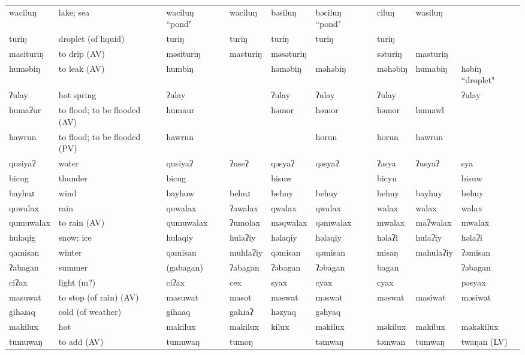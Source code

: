 \begin{landscape}
\begin{longtable}{*{9}{p{}}}
\text{*}waciluŋ & lake; sea & waciluŋ ``pond" & waciluŋ & bəsiluŋ & bəciluŋ ``pond" & ciluŋ & wasiluŋ & \\
\text{*}turiŋ & droplet (of liquid) & turiŋ & turiŋ & turiŋ & turiŋ & turiŋ &  & \\
\text{*}masituriŋ & to drip (AV) & məsituriŋ & masturiŋ & məsəturiŋ &  & səturiŋ & masturiŋ & \\
\text{*}huməbiŋ & to leak (AV) & humbiŋ &  & həməbiŋ & məhəbiŋ & məhəbiŋ & humabiŋ & həbiŋ ``droplet"\\
\text{*}ʔulay & hot spring & ʔulay &  & ʔulay & ʔulay & ʔulay &  & ʔulay\\
\text{*}humaʔur & to flood; to be flooded (AV) & humaur &  & həmor & həmor & həmor & humawl & \\
\text{*}hawrun & to flood; to be flooded (PV) & hawrun &  &  & horun & horun & hawrun & \\
\text{*}qusiyaʔ & water & qusiyaʔ & ʔuseʔ & qəsyaʔ & qəsyaʔ & ʔəsya & ʔusyaʔ & sya\\
\text{*}bicug & thunder & bicug &  & bisuw &  & bicyu &  & bisuw\\
\text{*}bayhuɹ & wind & bayhuw & behuɹ & behuy & behuy & behuy & bayhuy & behuy\\
\text{*}quwalax & rain & quwalax & ʔawalax & qwalax & qwalax & walax & walax & walax\\
\text{*}qumuwalax & to rain (AV) & qumuwalax & ʔumolax & məqwalax & qəmwalax & mwalax & maʔwalax & mwalax\\
\text{*}hulaqig & snow; ice & hulaqiy & hulaʔiy & həlaqiy & həlaqiy & həlaʔi & hulaʔiy & həlaʔi\\
\text{*}qamisan & winter & qamisan & muhlaʔiy & qəmisan & qəmisan & misaŋ & mahulaʔiy & ʔəmisan\\
\text{*}ʔabagan & summer & (gabagan) & ʔabagan & ʔəbagan & ʔəbagan & bagan &  & ʔəbagan\\
\text{*}ciʔax & light (m?) & ciʔax & cex & syax & cyax & cyax &  & pəsyax\\
\text{*}masuwat & to stop (of rain) (AV) & masuwat & masot & məswat & məswat & məswat & masiwat & məsiwat\\
\text{*}gihəɹaq & cold (of weather) & gihaaq & gahɹaʔ & həzyaq & gəhyaq &  &  & \\
\text{*}makilux & hot & makilux & makilux & kilux & məkilux & məkilux & makilux & məkəkilux\\
\text{*}tumuwaŋ & to add (AV) & tumuwaŋ & tumoŋ &  & təmwaŋ & təmwan & tumwaŋ & twaŋan (LV)\\

\end{longtable}
\end{landscape}
